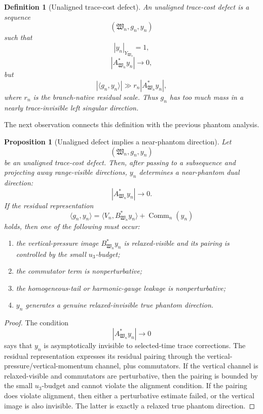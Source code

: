 \documentclass[11pt]{article}
\numberwithin{equation}{section}
\newtheorem{proposition}[theorem]{Proposition}
\newtheorem{definition}[theorem]{Definition}
\begin{document}
\begin{definition}[Unaligned trace-cost defect]
An unaligned trace-cost defect is a sequence
\[
(\mathfrak W_n,g_n,y_n)
\]
such that
\[
|y_n|_{Y_{\mathfrak W_n}}=1,
\]
\[
|A_{\mathfrak W_n}^*y_n|\to0,
\]
but
\begin{equation}
|\langle g_n,y_n\rangle|
\gg
r_n|A_{\mathfrak W_n}^*y_n|,
\label{eq:tag-10-238}
\end{equation}
where \(r_n\) is the branch-native residual scale. Thus \(g_n\) has too much mass in a nearly trace-invisible left singular direction.
\end{definition}

The next observation connects this definition with the previous phantom analysis.

\begin{proposition}[Unaligned defect implies a near-phantom direction]
Let
\[
(\mathfrak W_n,g_n,y_n)
\]
be an unaligned trace-cost defect. Then, after passing to a subsequence and projecting away range-visible directions, \(y_n\) determines a near-phantom dual direction:
\[
|A_{\mathfrak W_n}^*y_n|\to0.
\]
If the residual representation
\begin{equation}
\langle g_n,y_n\rangle =
\langle V_n,B_{\mathfrak W_n}^*y_n\rangle
+
\operatorname{Comm}_n(y_n)
\label{eq:tag-10-239}
\end{equation}
holds, then one of the following must occur:

\begin{enumerate}
\item the vertical-pressure image \(B_{\mathfrak W_n}^*y_n\) is relaxed-visible and its pairing is controlled by the small \(u_3\)-budget;
\item the commutator term is nonperturbative;
\item the homogeneous-tail or harmonic-gauge leakage is nonperturbative;
\item \(y_n\) generates a genuine relaxed-invisible true phantom direction.
\end{enumerate}
\end{proposition}

\begin{proof}
The condition
\[
|A_{\mathfrak W_n}^*y_n|\to0
\]
says that \(y_n\) is asymptotically invisible to selected-time trace corrections. The residual representation expresses its residual pairing through the vertical-pressure/vertical-momentum channel, plus commutators. If the vertical channel is relaxed-visible and commutators are perturbative, then the pairing is bounded by the small \(u_3\)-budget and cannot violate the alignment condition. If the pairing does violate alignment, then either a perturbative estimate failed, or the vertical image is also invisible. The latter is exactly a relaxed true phantom direction.
\end{proof}
\end{document}
